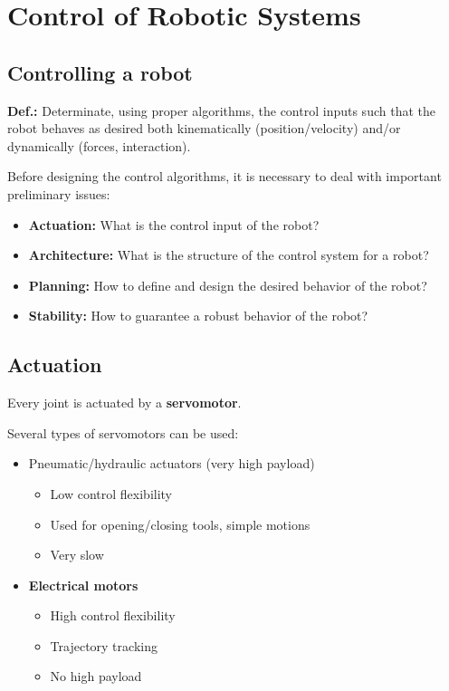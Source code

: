 \section{Control of Robotic Systems}

\subsection{Controlling a robot}

\textbf{Def.:} Determinate, using proper algorithms, the control inputs such that the robot behaves as desired both kinematically (position/velocity) and/or dynamically (forces, interaction).

Before designing the control algorithms, it is necessary to deal with important preliminary issues:

\begin{itemize}
    \item \textbf{Actuation:} What is the control input of the robot?
    \item \textbf{Architecture:} What is the structure of the control system for a robot?
    \item \textbf{Planning:} How to define and design the desired behavior of the robot?
    \item \textbf{Stability:} How to guarantee a robust behavior of the robot?
\end{itemize}

\hfill

\subsection{Actuation}

Every joint is actuated by a \textbf{servomotor}.
    
Several types of servomotors can be used:

\begin{itemize}
    \item Pneumatic/hydraulic actuators (very high payload)
    \begin{itemize}
        \item Low control flexibility
        \item Used for opening/closing tools, simple motions
        \item Very slow
    \end{itemize}
    \item \textbf{Electrical motors}
    \begin{itemize}
        \item High control flexibility
        \item Trajectory tracking
        \item No high payload
    \end{itemize}
\end{itemize}
    
